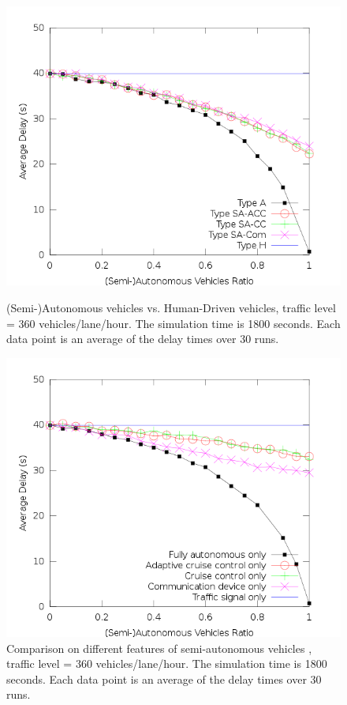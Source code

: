 \begin{figure}

\centering
\includegraphics[width=0.8\columnwidth]{figures/figure_2.png}
\caption{(Semi-)Autonomous vehicles vs. Human-Driven vehicles, traffic
level = 360 vehicles/lane/hour. The simulation time is 1800 seconds.
Each data point is an average of the delay times over 30 runs.}
\label{fig:figure2}

\centering
\includegraphics[width=0.8\columnwidth]{figures/figure_1.png}
\caption{Comparison on different features of semi-autonomous vehicles
, traffic level = 360 vehicles/lane/hour. The simulation time is 1800
seconds. Each data point is an average of the delay times over 30 runs.}
\label{fig:figure1}

\mbox{}

\end{figure}

